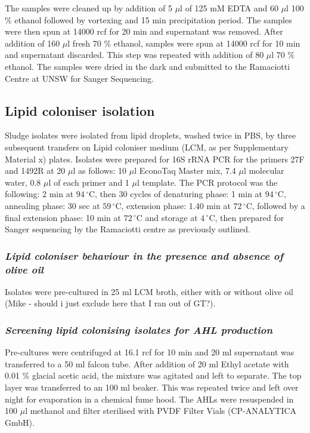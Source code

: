 \documentclass[twoside]{article}
\begin{document}
The samples were cleaned up by addition of 5 $\mu$l of 125 mM EDTA and 60 $\mu$l 100 \% ethanol followed by vortexing and 15 min precipitation period. The samples were then spun at 14000 rcf for 20 min and supernatant was removed. After addition of 160 $\mu$l fresh 70 \% ethanol, samples were spun at 14000 rcf for 10 min and supernatant discarded. This step was repeated with addition of 80 $\mu$l 70 \% ethanol. The samples were dried in the dark and submitted to the Ramaciotti Centre at UNSW for Sanger Sequencing.

\subsection{Lipid coloniser isolation}
Sludge isolates  were isolated from lipid droplets, washed twice in PBS, by three subsequent transfers on Lipid coloniser medium (LCM, as per Supplementary Material x) plates. Isolates were prepared for 16S rRNA PCR for the primers 27F and 1492R at 20 $\mu$l as follows: 10 $\mu$l EconoTaq Master mix, 7.4 $\mu$l molecular water, 0.8 $\mu$l of each primer and 1 $\mu$l template. The PCR protocol was the following: 2 min at $94\,^{\circ}\mathrm{C}$, then 30 cycles of denaturing phase: 1 min at $94\,^{\circ}\mathrm{C}$, annealing phase: 30 sec at  $59\,^{\circ}\mathrm{C}$, extension phase: 1.40 min at $72\,^{\circ}\mathrm{C}$, followed by a final extension phase: 10 min at $72\,^{\circ}\mathrm{C}$ and storage at $4\,^{\circ}\mathrm{C}$, then prepared for Sanger sequencing by the Ramaciotti centre as previously outlined.

\subsubsection{\emph{Lipid coloniser behaviour in the presence and absence of olive oil}}
Isolates were pre-cultured in 25 ml LCM broth, either with or without olive oil (Mike - should i just exclude here that I ran out of GT?). 

\subsubsection{\emph{Screening lipid colonising isolates for AHL production}}
Pre-cultures were centrifuged at 16.1 rcf for 10 min and 20 ml supernatant was transferred to a 50 ml falcon tube. After addition of 20 ml Ethyl acetate with 0.01 \% glacial acetic acid, the mixture was agitated and left to separate. The top  layer was transferred to an 100 ml beaker. This was repeated twice and left over night for evaporation in a chemical fume hood. The AHLs were resuspended in 100  $\mu$l methanol and filter sterilised with PVDF Filter Vials (CP-ANALYTICA GmbH). \\
\end{document}
